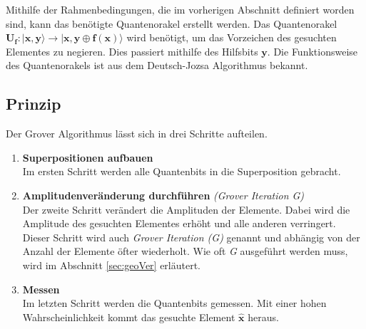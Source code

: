 
Mithilfe der Rahmenbedingungen, die im vorherigen Abschnitt definiert worden sind, kann das benötigte Quantenorakel erstellt werden. Das Quantenorakel $\mathbf{U_f : | x,y \rangle \to |x,y \oplus f(x) \rangle}$ wird benötigt, um das Vorzeichen des gesuchten Elementes zu negieren. Dies passiert mithilfe des Hilfsbits $\mathbf{y}$. Die Funktionsweise des Quantenorakels ist aus dem Deutsch-Jozsa Algorithmus bekannt.

\subsection{Prinzip}
Der Grover Algorithmus lässt sich in drei Schritte aufteilen.
\begin{enumerate}
	\item \textbf{Superpositionen aufbauen}
	\\
	Im ersten Schritt werden alle Quantenbits in die Superposition gebracht.
	\item \textbf{Amplitudenveränderung durchführen} \emph{(Grover Iteration G)}
	\\
	Der zweite Schritt verändert die Amplituden der Elemente. Dabei wird die Amplitude des gesuchten Elementes erhöht und alle anderen verringert. Dieser Schritt wird auch \emph{Grover Iteration (G)} genannt und abhängig von der Anzahl der Elemente öfter wiederholt. Wie oft \emph{G} ausgeführt werden muss, wird im Abschnitt \ref{sec:geoVer} erläutert.
	\item \textbf{Messen} 
	\\
	Im letzten Schritt werden die Quantenbits gemessen. Mit einer hohen Wahrscheinlichkeit kommt das gesuchte Element $\mathbf{\hat x}$ heraus.
\end{enumerate}

